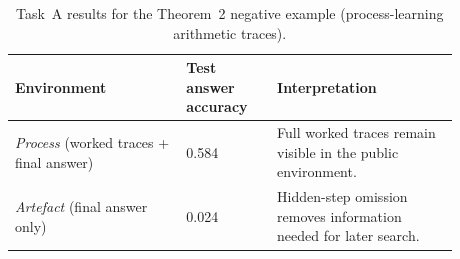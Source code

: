 \begin{table}[t]
\centering
\caption{Task~A results for the Theorem~2 negative example (process-learning arithmetic traces).}
\label{tab:appx-theorem2-negative-protocol}
\begin{tabular}{p{0.34\linewidth}p{0.18\linewidth}p{0.36\linewidth}}
\toprule
Environment & Test answer accuracy & Interpretation \\
\midrule
\emph{Process} (worked traces + final answer) & 0.584 & Full worked traces remain visible in the public environment. \\
\emph{Artefact} (final answer only) & 0.024 & Hidden-step omission removes information needed for later search. \\
\bottomrule
\end{tabular}
\end{table}
